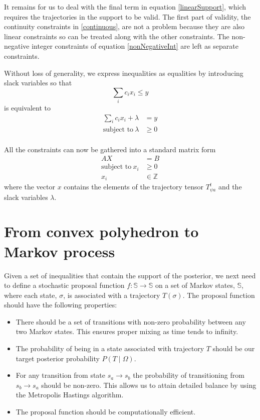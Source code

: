 \documentclass{article}
\begin{document}
It remains for us to deal with the final term in equation \ref{linearSupport}, which requires the trajectories in the support to be valid. The first part of validity, the continuity constraints in \ref{continuous}, are not a problem because they are also linear constraints so can be treated along with the other constraints. The non-negative integer constraints of equation \ref{nonNegativeInt} are left as separate constraints.

Without loss of generality, we express inequalities as equalities by introducing slack variables so that
\[
\sum_i c_i x_i \le y
\]
is equivalent to
\[
\begin{split}
 \sum_i c_i x_i + \lambda & = y \\
\text{subject to}\ \lambda & \ge 0 \\
\end{split}
\]

All the constraints can now be gathered into a standard matrix form
\begin{equation}
\begin{split}
AX &= B \\
\text{subject to}\ x_i &\ge 0\\
x_i &\in \mathbb{Z}
\end{split}
\label{Axy}
\end{equation}
where the vector $x$ contains the elements of the trajectory tensor $T^t_{\psi a}$ and the slack variables $\lambda$.

\section{From convex polyhedron to Markov process}

Given a set of inequalities that contain the support of the posterior, we next need to define a stochastic proposal function $f:\mathbb{S} \to \mathbb{S}$ on a set of Markov states, $\mathbb{S}$, where each state, $\sigma$, is associated with a trajectory $T(\sigma)$. The proposal function should have the following properties:
\begin{itemize}
\item There should be a set of transitions with non-zero probability between any two Markov states. This ensures proper mixing as time tends to infinity.

\item The probability of being in a state associated with trajectory $T$ should be our target posterior probability $P(T \mid \Omega)$.

\item For any transition from state $s_a \to s_b$ the probability of transitioning from $s_b \to s_a$ should be non-zero. This allows us to attain detailed balance by using the Metropolis Hastings algorithm.

\item The proposal function should be computationally efficient. 
\end{itemize}
\end{document}
